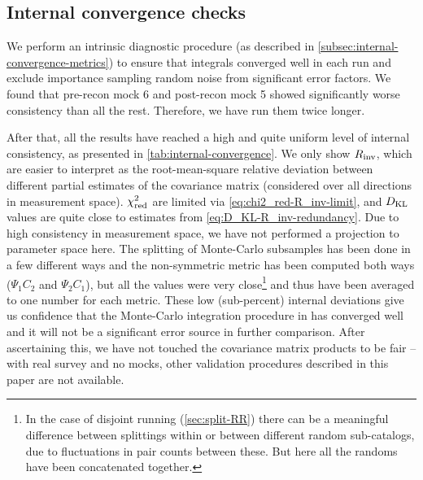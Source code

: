 \subsection{Internal convergence checks}
\label{subsec:internal-convergence-checks}

We perform an intrinsic diagnostic procedure (as described in \cref{subsec:internal-convergence-metrics}) to ensure that \rascalc{} integrals converged well in each run and exclude importance sampling random noise from significant error factors.
We found that pre-recon mock 6 and post-recon mock 5 showed significantly worse consistency than all the rest.
Therefore, we have run them twice longer.

After that, all the \rascalc{} results have reached a high and quite uniform level of internal consistency, as presented in \cref{tab:internal-convergence}.
We only show $R_{\rm inv}$, which are easier to interpret as the root-mean-square relative deviation between different partial estimates of the covariance matrix (considered over all directions in measurement space).
$\chi^2_{\rm red}$ are limited via \cref{eq:chi2_red-R_inv-limit}, and $D_{\rm KL}$ values are quite close to estimates from \cref{eq:D_KL-R_inv-redundancy}.
Due to high consistency in measurement space, we have not performed a projection to parameter space here.
The splitting of Monte-Carlo subsamples has been done in a few different ways and the non-symmetric metric has been computed both ways ($\Psi_1C_2$ and $\Psi_2C_1$), but all the values were very close\footnote{In the case of disjoint running (\cref{sec:split-RR}) there can be a meaningful difference between splittings within or between different random sub-catalogs, due to fluctuations in pair counts between these. But here all the randoms have been concatenated together.} and thus have been averaged to one number for each metric.
These low (sub-percent) internal deviations give us confidence that the Monte-Carlo integration procedure in \rascalc{} has converged well and it will not be a significant error source in further comparison.
After ascertaining this, we have not touched the covariance matrix products to be fair -- with real survey and no mocks, other validation procedures described in this paper are not available.

